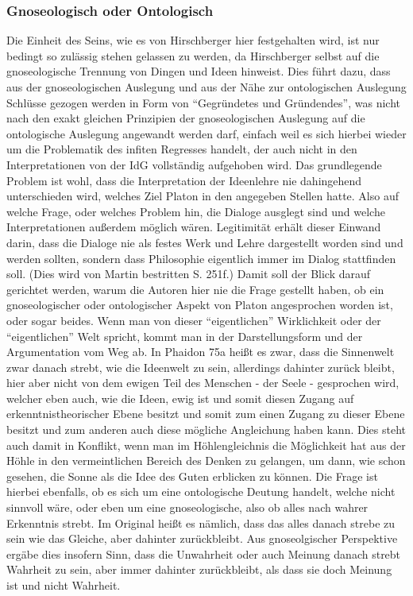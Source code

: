 \subsubsection{Gnoseologisch oder Ontologisch}
Die Einheit des Seins, wie es von Hirschberger hier festgehalten wird, ist nur bedingt so zulässig stehen gelassen zu werden, da Hirschberger selbst auf die gnoseologische Trennung von Dingen und Ideen hinweist. 
Dies führt dazu, dass aus der gnoseologischen Auslegung und aus der Nähe zur ontologischen Auslegung Schlüsse gezogen werden in Form von \enquote{Gegründetes und Gründendes}, was nicht nach den exakt gleichen Prinzipien der gnoseologischen Auslegung auf die ontologische Auslegung angewandt werden darf, einfach weil es sich hierbei wieder um die Problematik des infiten Regresses handelt, der auch nicht in den Interpretationen von der IdG vollständig aufgehoben wird.  
Das grundlegende Problem ist wohl, dass die Interpretation der Ideenlehre nie dahingehend unterschieden wird, welches Ziel Platon in den angegeben Stellen hatte. Also auf welche Frage, oder welches Problem hin, die Dialoge ausglegt sind und welche Interpretationen außerdem möglich wären. Legitimität erhält dieser Einwand darin, dass die Dialoge nie als festes Werk und Lehre dargestellt worden sind und werden sollten, sondern dass Philosophie eigentlich immer im Dialog stattfinden soll. (Dies wird von Martin bestritten S. 251f.) Damit soll der Blick darauf gerichtet werden, warum die Autoren hier nie die Frage gestellt haben, ob ein gnoseologischer oder ontologischer Aspekt von Platon angesprochen worden ist, oder sogar beides.  
Wenn man von dieser \enquote{eigentlichen} Wirklichkeit oder der \enquote{eigentlichen} Welt spricht, kommt man in der Darstellungsform und der Argumentation vom Weg ab. In Phaidon 75a heißt es zwar, dass die Sinnenwelt zwar danach strebt, wie die Ideenwelt zu sein, allerdings dahinter zurück bleibt, hier aber nicht von dem ewigen Teil des Menschen - der Seele - gesprochen wird, welcher eben auch, wie die Ideen, ewig ist und somit diesen Zugang auf erkenntnistheorischer Ebene besitzt und somit zum einen Zugang zu dieser Ebene besitzt und zum anderen auch diese mögliche Angleichung haben kann. Dies steht auch damit in Konflikt, wenn man im Höhlengleichnis die Möglichkeit hat aus der Höhle in den vermeintlichen Bereich des Denken zu gelangen, um dann, wie schon gesehen, die Sonne als die Idee des Guten erblicken zu können. Die Frage ist hierbei ebenfalls, ob es sich um eine ontologische Deutung handelt, welche nicht sinnvoll wäre, oder eben um eine gnoseologische, also ob alles nach wahrer Erkenntnis strebt. Im Original heißt es nämlich, dass das alles danach strebe zu sein wie das Gleiche, aber dahinter zurückbleibt. Aus gnoseolgischer Perspektive ergäbe dies insofern Sinn, dass die Unwahrheit oder auch Meinung danach strebt Wahrheit zu sein, aber immer dahinter zurückbleibt, als dass sie doch Meinung ist und nicht Wahrheit. 
